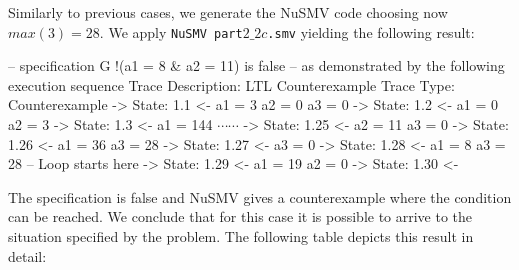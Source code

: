 \begin{description}
  Similarly to previous cases, we generate the NuSMV code choosing now $max(3)=28$. We apply {\tt NuSMV part$2\_2c$.smv} yielding the following result:

      \vspace{2mm}
\selectfont
{\footnotesize
\noindent
-- specification  G !(a1 = 8 \& a2 = 11)  is false\newline
-- as demonstrated by the following execution sequence\newline
Trace Description: LTL Counterexample\newline
Trace Type: Counterexample\newline
  -> State: 1.1 <-\newline
    a1 = 3\newline
    a2 = 0\newline
    a3 = 0\newline
  -> State: 1.2 <-\newline
    a1 = 0\newline
    a2 = 3\newline
  -> State: 1.3 <-\newline
    a1 = 144\newline
  $\cdots \cdots$
  \newline
  -> State: 1.25 <-\newline
    a2 = 11\newline
    a3 = 0\newline
  -> State: 1.26 <-\newline
    a1 = 36\newline
    a3 = 28\newline
  -> State: 1.27 <-\newline
    a3 = 0\newline
  -> State: 1.28 <-\newline
    a1 = 8\newline
    a3 = 28\newline
  -- Loop starts here\newline
  -> State: 1.29 <-\newline
    a1 = 19\newline
    a2 = 0\newline
  -> State: 1.30 <-\newline
}
\selectfont
\end{description}
The specification is false and NuSMV gives a counterexample where the condition can be reached. We conclude that for this case it is possible to arrive to the situation specified by the problem. The following table depicts this result in detail:

